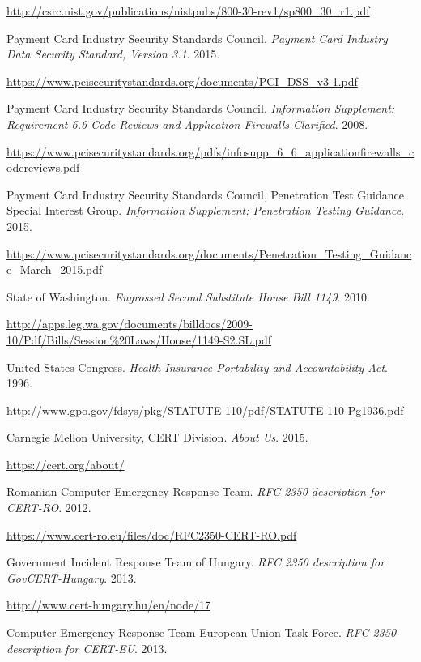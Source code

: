 \documentclass[a4paper,12pt]{article}
\newcommand{\refspace}{\vspace{-2mm}}
\begin{document}
\begin{thebibliography}{}
		\refspace
		\url{http://csrc.nist.gov/publications/nistpubs/800-30-rev1/sp800_30_r1.pdf}
		
		Payment Card Industry Security Standards Council. \textit{Payment Card Industry Data Security Standard, Version 3.1}. 2015.
		
		\refspace
		\url{https://www.pcisecuritystandards.org/documents/PCI_DSS_v3-1.pdf}
		
		Payment Card Industry Security Standards Council. \textit{Information Supplement: Requirement 6.6 Code Reviews and Application Firewalls Clarified}. 2008.
		
		\refspace
		\url{https://www.pcisecuritystandards.org/pdfs/infosupp_6_6_applicationfirewalls_codereviews.pdf}
		
		Payment Card Industry Security Standards Council, Penetration Test Guidance Special Interest Group. \textit{Information Supplement: Penetration Testing Guidance}. 2015.
		
		\refspace
		\url{https://www.pcisecuritystandards.org/documents/Penetration_Testing_Guidance_March_2015.pdf}
		
		State of Washington. \textit{Engrossed Second Substitute House Bill 1149}. 2010.
		
		\refspace
		\url{http://apps.leg.wa.gov/documents/billdocs/2009-10/Pdf/Bills/Session\%20Laws/House/1149-S2.SL.pdf}
		
		United States Congress. \textit{Health Insurance Portability and Accountability Act}. 1996.
		
		\refspace
		\url{http://www.gpo.gov/fdsys/pkg/STATUTE-110/pdf/STATUTE-110-Pg1936.pdf}
		
		Carnegie Mellon University, CERT Division. \textit{About Us}. 2015.
		
		\refspace
		\url{https://cert.org/about/}
		
		Romanian Computer Emergency Response Team. \textit{RFC 2350 description for CERT-RO}. 2012.
		
		\refspace
		\url{https://www.cert-ro.eu/files/doc/RFC2350-CERT-RO.pdf}
		
		Government Incident Response Team of Hungary. \textit{RFC 2350 description for GovCERT-Hungary}. 2013.
		
		\refspace
		\url{http://www.cert-hungary.hu/en/node/17}
		
		Computer Emergency Response Team European Union Task Force. \textit{RFC 2350 description for CERT-EU}. 2013.
		

\end{thebibliography}
\end{document}
